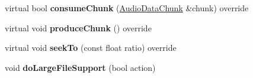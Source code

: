 \begin{DoxyCompactItemize}
virtual bool {\bfseries consume\+Chunk} (\hyperlink{structexperimental_1_1AudioDataChunk}{Audio\+Data\+Chunk} \&chunk) override
\item 
\mbox{\label{classexperimental_1_1MP3Reader_a82885ce6df03ba1f419486a9e81c0ca0}} 
virtual void {\bfseries produce\+Chunk} () override
\item 
\mbox{\label{classexperimental_1_1MP3Reader_a26973f2926317bc98930f7a8487fc166}} 
virtual void {\bfseries seek\+To} (const float ratio) override
\item 
\mbox{\label{classexperimental_1_1MP3Reader_a3b38058930f37a88b3db567e60d8011b}} 
void {\bfseries do\+Large\+File\+Support} (bool action)
\end{DoxyCompactItemize}
